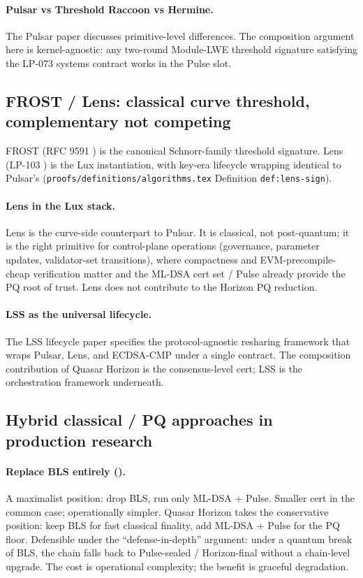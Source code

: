 \paragraph{Pulsar vs Threshold Raccoon vs Hermine.} The Pulsar paper \cite{luxpulsar} discusses primitive-level differences. The composition argument here is kernel-agnostic: any two-round Module-LWE threshold signature satisfying the LP-073 systems contract works in the Pulse slot.

\subsection{FROST / Lens: classical curve threshold, complementary not competing}

FROST (RFC 9591 \cite{rfc9591}) is the canonical Schnorr-family threshold signature. Lens (LP-103 \cite{lp103}) is the Lux instantiation, with key-era lifecycle wrapping identical to Pulsar's (\texttt{proofs/definitions/algorithms.tex} Definition \texttt{def:lens-sign}).

\paragraph{Lens in the Lux stack.} Lens is the curve-side counterpart to Pulsar. It is classical, not post-quantum; it is the right primitive for control-plane operations (governance, parameter updates, validator-set transitions), where compactness and EVM-precompile-cheap verification matter and the ML-DSA cert set / Pulse already provide the PQ root of trust. Lens does not contribute to the Horizon PQ reduction.

\paragraph{LSS as the universal lifecycle.} The LSS lifecycle paper \cite{luxlssmpc} specifies the protocol-agnostic resharing framework that wraps Pulsar, Lens, and ECDSA-CMP under a single contract. The composition contribution of Quasar Horizon is the consensus-level cert; LSS is the orchestration framework underneath.

\subsection{Hybrid classical / PQ approaches in production research}

\paragraph{Replace BLS entirely (\cite{pqfinalitynobls}).} A maximalist position: drop BLS, run only ML-DSA + Pulse. Smaller cert in the common case; operationally simpler. Quasar Horizon takes the conservative position: keep BLS for fast classical finality, add ML-DSA + Pulse for the PQ floor. Defensible under the ``defense-in-depth'' argument: under a quantum break of BLS, the chain falls back to Pulse-sealed / Horizon-final without a chain-level upgrade. The cost is operational complexity; the benefit is graceful degradation.

